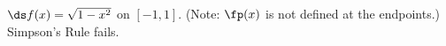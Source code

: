 {$\ds f(x) = \sqrt{1-x^2}$ on $[-1, 1]$. (Note: $\fp(x)$ is not defined at the endpoints.)}
{Simpson's Rule fails.}
